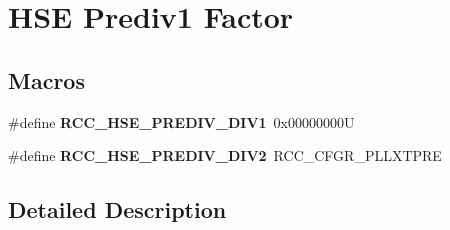 \hypertarget{group___r_c_c_ex___prediv1___factor}{}\section{H\+SE Prediv1 Factor}
\label{group___r_c_c_ex___prediv1___factor}
\subsection*{Macros}
\begin{DoxyCompactItemize}
\item 
\mbox{\label{group___r_c_c_ex___prediv1___factor_gaab87e46cf9de9a7bd69b5844e3fb6e8d}} 
\#define {\bfseries R\+C\+C\+\_\+\+H\+S\+E\+\_\+\+P\+R\+E\+D\+I\+V\+\_\+\+D\+I\+V1}~0x00000000U
\item 
\mbox{\label{group___r_c_c_ex___prediv1___factor_gaac01eab0da229849f4619a7d69dda65e}} 
\#define {\bfseries R\+C\+C\+\_\+\+H\+S\+E\+\_\+\+P\+R\+E\+D\+I\+V\+\_\+\+D\+I\+V2}~R\+C\+C\+\_\+\+C\+F\+G\+R\+\_\+\+P\+L\+L\+X\+T\+P\+RE
\end{DoxyCompactItemize}


\subsection{Detailed Description}
